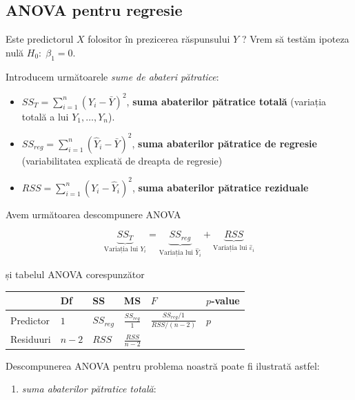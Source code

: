 \documentclass[]{article}
\providecommand{\tightlist}{%
  \setlength{\itemsep}{0pt}\setlength{\parskip}{0pt}}
\begin{document}
\subsection{ANOVA pentru regresie}\label{anova-pentru-regresie}

Este predictorul \(X\) folositor în prezicerea răspunsului \(Y\) ? Vrem
să testăm ipoteza nulă \(H_0:\;\beta_1=0\).

Introducem următoarele \emph{sume de abateri pătratice}:

\begin{itemize}
\tightlist
\item
  \(SS_T=\sum_{i=1}^n\left(Y_i-\bar Y\right)^2\), \textbf{suma
  abaterilor pătratice totală} (variația totală a lui
  \(Y_1,\ldots,Y_n\)).
\item
  \(SS_{reg}=\sum_{i=1}^n\left(\hat Y_i-\bar Y\right)^2\), \textbf{suma
  abaterilor pătratice de regresie} (variabilitatea explicată de dreapta
  de regresie)
\item
  \(RSS=\sum_{i=1}^n\left(Y_i-\hat Y_i\right)^2\), \textbf{suma
  abaterilor pătratice reziduale}
\end{itemize}

Avem următoarea descompunere ANOVA

\[
\underbrace{SS_T}_{\text{Variația lui }Y_i} = \underbrace{SS_{reg}}_{\text{Variația lui }\hat Y_i} + \underbrace{RSS}_{\text{Variația lui }\hat \varepsilon_i} 
\]

și tabelul ANOVA corespunzător

\begin{longtable}[]{@{}llllll@{}}
\toprule
& Df & SS & MS & \(F\) & \(p\)-value\tabularnewline
\midrule
\endhead
Predictor & \(1\) & \(SS_{reg}\) & \(\frac{SS_{reg}}{1}\) &
\(\frac{SS_{reg}/1}{RSS/(n-2)}\) & \(p\)\tabularnewline
Residuuri & \(n - 2\) & \(RSS\) & \(\frac{RSS}{n-2}\) & &\tabularnewline
\bottomrule
\end{longtable}

Descompunerea ANOVA pentru problema noastră poate fi ilustrată astfel:

\begin{enumerate}
\def\labelenumi{\alph{enumi})}
\tightlist
\item
  \emph{suma abaterilor pătratice totală}:
\end{enumerate}
\end{document}
